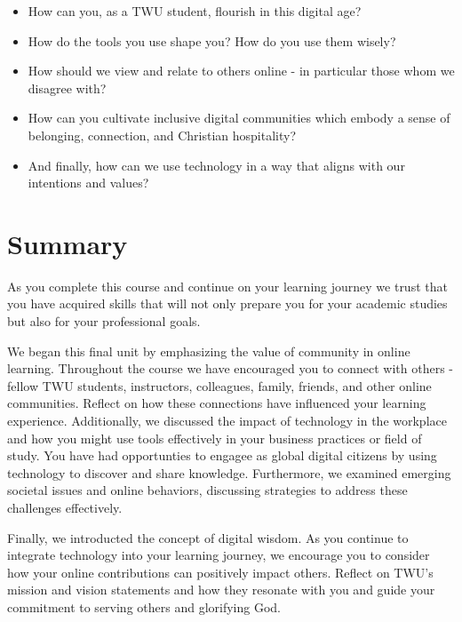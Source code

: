 \documentclass[
]{book}
\providecommand{\tightlist}{%
  \setlength{\itemsep}{0pt}\setlength{\parskip}{0pt}}
\theoremstyle{definition}
\theoremstyle{definition}
\theoremstyle{definition}
\theoremstyle{definition}
\theoremstyle{remark}
\begin{document}
\begin{reflect}
\begin{itemize}
\tightlist
\item
  How can you, as a TWU student, flourish in this digital age?\\
\item
  How do the tools you use shape you? How do you use them wisely?\\
\item
  How should we view and relate to others online - in particular those whom we disagree with?\\
\item
  How can you cultivate inclusive digital communities which embody a sense of belonging, connection, and Christian hospitality?\\
\item
  And finally, how can we use technology in a way that aligns with our intentions and values?
\end{itemize}
\end{reflect}

\hypertarget{summary-5}{%
\section*{Summary}\label{summary-5}}

As you complete this course and continue on your learning journey we trust that you have acquired skills that will not only prepare you for your academic studies but also for your professional goals.

We began this final unit by emphasizing the value of community in online learning. Throughout the course we have encouraged you to connect with others - fellow TWU students, instructors, colleagues, family, friends, and other online communities. Reflect on how these connections have influenced your learning experience. Additionally, we discussed the impact of technology in the workplace and how you might use tools effectively in your business practices or field of study. You have had opportunties to engagee as global digital citizens by using technology to discover and share knowledge. Furthermore, we examined emerging societal issues and online behaviors, discussing strategies to address these challenges effectively.

Finally, we introducted the concept of digital wisdom. As you continue to integrate technology into your learning journey, we encourage you to consider how your online contributions can positively impact others. Reflect on TWU's mission and vision statements and how they resonate with you and guide your commitment to serving others and glorifying God.
\end{document}
